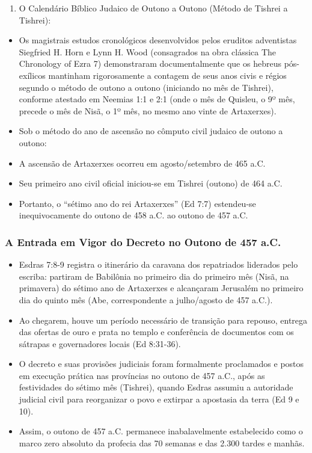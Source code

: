 \documentclass[11pt,a4paper,openany]{book}
\begin{document}
\begin{enumerate}
  \item O Calendário Bíblico Judaico de Outono a Outono (Método de Tishrei a Tishrei):
\end{enumerate}

\begin{itemize}
  \item Os magistrais estudos cronológicos desenvolvidos pelos eruditos adventistas Siegfried H. Horn e Lynn H. Wood (consagrados na obra clássica The Chronology of Ezra 7) demonstraram documentalmente que os hebreus pós-exílicos mantinham rigorosamente a contagem de seus anos civis e régios segundo o método de outono a outono (iniciando no mês de Tishrei), conforme atestado em Neemias 1:1 e 2:1 (onde o mês de Quisleu, o 9º mês, precede o mês de Nisã, o 1º mês, no mesmo ano vinte de Artaxerxes).
  \item Sob o método do ano de ascensão no cômputo civil judaico de outono a outono:
  \item A ascensão de Artaxerxes ocorreu em agosto/setembro de 465 a.C.
  \item Seu primeiro ano civil oficial iniciou-se em Tishrei (outono) de 464 a.C.
  \item Portanto, o ``sétimo ano do rei Artaxerxes'' (Ed 7:7) estendeu-se inequivocamente do outono de 458 a.C. ao outono de 457 a.C.
\end{itemize}



\subsubsection*{A Entrada em Vigor do Decreto no Outono de 457 a.C.}
\begin{itemize}
  \item Esdras 7:8-9 registra o itinerário da caravana dos repatriados liderados pelo escriba: partiram de Babilônia no primeiro dia do primeiro mês (Nisã, na primavera) do sétimo ano de Artaxerxes e alcançaram Jerusalém no primeiro dia do quinto mês (Abe, correspondente a julho/agosto de 457 a.C.).
  \item Ao chegarem, houve um período necessário de transição para repouso, entrega das ofertas de ouro e prata no templo e conferência de documentos com os sátrapas e governadores locais (Ed 8:31-36).
  \item O decreto e suas provisões judiciais foram formalmente proclamados e postos em execução prática nas províncias no outono de 457 a.C., após as festividades do sétimo mês (Tishrei), quando Esdras assumiu a autoridade judicial civil para reorganizar o povo e extirpar a apostasia da terra (Ed 9 e 10).
  \item Assim, o outono de 457 a.C. permanece inabalavelmente estabelecido como o marco zero absoluto da profecia das 70 semanas e das 2.300 tardes e manhãs.
\end{itemize}
\end{document}
